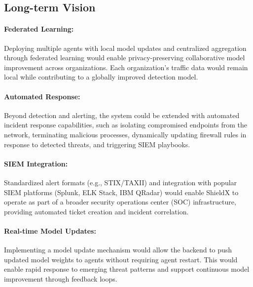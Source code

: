 \documentclass[../Main.tex]{subfiles}
\begin{document}
\subsection{Long-term Vision}

\paragraph{Federated Learning:} Deploying multiple agents with local model updates and centralized aggregation through federated learning would enable privacy-preserving collaborative model improvement across organizations. Each organization's traffic data would remain local while contributing to a globally improved detection model.

\paragraph{Automated Response:} Beyond detection and alerting, the system could be extended with automated incident response capabilities, such as isolating compromised endpoints from the network, terminating malicious processes, dynamically updating firewall rules in response to detected threats, and triggering SIEM playbooks.

\paragraph{SIEM Integration:} Standardized alert formats (e.g., STIX/TAXII) and integration with popular SIEM platforms (Splunk, ELK Stack, IBM QRadar) would enable ShieldX to operate as part of a broader security operations center (SOC) infrastructure, providing automated ticket creation and incident correlation.

\paragraph{Real-time Model Updates:} Implementing a model update mechanism would allow the backend to push updated model weights to agents without requiring agent restart. This would enable rapid response to emerging threat patterns and support continuous model improvement through feedback loops.
\end{document}
